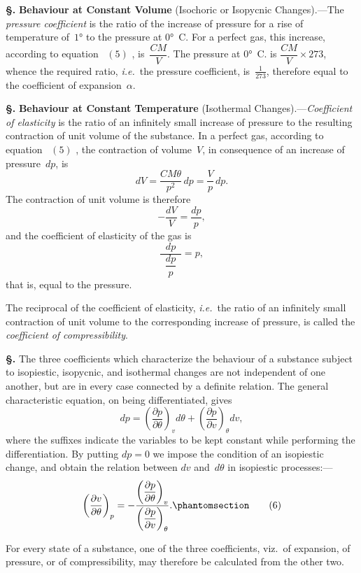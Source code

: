 \documentclass[12pt]{book}[2005/09/16]
\newcommand{\Chg}[2]{#2}
\newcommand{\Add}[1]{\Chg{}{#1}}
\newcommand{\Section}[1]{
  \medskip\par\textbf{§\;#1}
  \label{section:#1}
}
\newcommand{\Tag}[1]{%
  \phantomsection\label{eqn:#1}\tag*{\ensuremath{#1}}%
}
\newcommand{\Eq}[1]{%
  \hyperref[eqn:#1]{\ensuremath{#1}}%
}
\newcommand{\PageSep}[1]{\ignorespaces}
\newcommand{\Topic}[1]{\textbf{#1}}
\newcommand{\ie}{\emph{i.e.}}
\newcommand{\dd}{\partial}
\begin{document}
\Section{13.} \Topic{Behaviour at Constant Volume} (Isochoric or
Isopycnic Changes).---The \emph{pressure coefficient} is the ratio
%
of the increase of pressure for a rise of temperature of~$1°$ to
the pressure at $0°$~C\@. For a perfect gas, this increase, according
to equation~\Eq{(5)}, is~$\dfrac{CM}{V}$. The pressure at $0°$~C. is $\dfrac{CM}{V} × 273$,
whence the required ratio, \ie\ the pressure coefficient, is~$\frac{1}{273}$,
therefore equal to the coefficient of expansion~$\alpha$.

\Section{14.} \Topic{Behaviour at Constant Temperature} (Isothermal
Changes).---\emph{Coefficient of elasticity} is the ratio of an
\PageSep{8}
infinitely small increase of pressure to the resulting contraction
of unit volume of the substance. In a perfect gas,
according to equation~\Eq{(5)}, the contraction of volume~$V$, in
consequence of an increase of pressure~$dp$, is
\[
dV = \frac{CM\theta}{p^{2}}\, dp = \frac{V}{p}\, dp.
\]
The contraction of unit volume is therefore
\[
-\frac{dV}{V} = \frac{dp}{p},
\]
and the coefficient of elasticity of the gas is
%
\[
\frac{\;\;dp\;\;}{\dfrac{dp}{p}} = p,
\]
that is, equal to the pressure.

The reciprocal of the coefficient of elasticity, \ie\ the ratio
of an infinitely small contraction of unit volume to the
corresponding increase of pressure, is called the \emph{coefficient
of compressibility}.

\Section{15.} The three coefficients which characterize the behaviour
of a substance subject to isopiestic, isopycnic, and
isothermal changes are not independent of one another,
but are in every case connected by a definite relation.
The general characteristic equation, on being differentiated,
gives
\[
dp = \left(\frac{\dd p}{\dd \theta}\right)_{v} d\theta + \left(\frac{\dd p}{\dd v}\right)_{\theta} dv,
\]
where the suffixes indicate the variables to be kept constant
while performing the differentiation. By putting $dp = 0$
we impose the condition of an isopiestic change, and obtain
the relation between $dv$ and~$d\theta$ in isopiestic processes:---
\[
\left(\frac{\dd v}{\dd \theta}\right)_{p}
  = -\frac{\left(\dfrac{\dd p}{\dd \theta}\right)_{v}}
          {\left(\dfrac{\dd p}{\dd v}\right)_{\theta}}\Add{.}
\Tag{(6)}
\]
\PageSep{9}

For every state of a substance, one of the three
coefficients, viz.\ of expansion, of pressure, or of compressibility,
may therefore be calculated from the other two.
\end{document}
